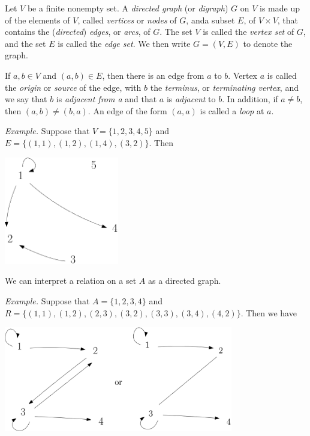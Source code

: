 \documentclass[11pt]{article}
\begin{document}
    Let $V$ be a finite nonempty set. A \emph{directed graph} (or \emph{digraph}) $G$ on $V$ is made up of the elements of $V$, called \emph{vertices} or \emph{nodes} of $G$, anda  subset $E$, of \(V \times V\), that contains the (\emph{directed}) \emph{edges}, or \emph{arcs}, of $G$. The set $V$ is called the \emph{vertex set} of $G$, and the set $E$ is called the \emph{edge set}. We then write \(G = (V,E)\) to denote the graph.

    \vspace{1em}

    If \(a,b \in V\) and \((a,b) \in E\), then there is an edge from $a$ to $b$. Vertex $a$ is called the \emph{origin} or \emph{source} of the edge, with $b$ the \emph{terminus}, or \emph{terminating vertex}, and we say that $b$ is \emph{adjacent from a} and that $a$ is \emph{adjacent} to $b$. In addition, if \(a \neq b\), then \((a,b) \neq (b,a).\) An edge of the form \((a,a)\) is called a \emph{loop} at $a$.

    \pagebreak

    \emph{Example.} Suppose that \(V = \{1,2,3,4,5\}\) and \(E = \{(1,1),(1,2),(1,4),(3,2)\}\). Then
    \begin{center}
        \includegraphics[width=5cm]{graph1.png}
    \end{center}

    We can interpret a relation on a set $A$ as a directed graph.

    \vspace{1em}

    \emph{Example.} Suppose that \(A = \{1,2,3,4\}\) and \(R = \{(1,1),(1,2),(2,3),(3,2),(3,3),(3,4),(4,2)\}\). Then we have 

    \begin{center}
        \includegraphics[width=10cm]{graph2.png}
    \end{center}
\end{document}
